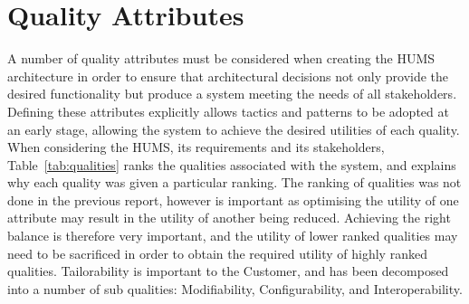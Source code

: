 \documentclass[10pt,a4paper]{article}
\begin{document}
\section{Quality Attributes}
\label{sec:qualities}
A number of quality attributes must be considered when creating the HUMS architecture in order to ensure that architectural decisions not only provide the desired functionality but produce a system meeting the needs of all stakeholders.
Defining these attributes explicitly allows tactics and patterns to be adopted at an early stage, allowing the system to achieve the desired utilities of each quality. 
When considering the HUMS, its requirements and its stakeholders, Table~\ref{tab:qualities} ranks the qualities associated with the system, and explains why each quality was given a particular ranking. The ranking of qualities was not done in the previous report, however is important as optimising the utility of one attribute may result in the utility of another being reduced. Achieving the right balance is therefore very important, and the utility of lower ranked qualities may need to be sacrificed in order to obtain the required utility of highly ranked qualities. Tailorability is important to the Customer, and has been decomposed into a number of sub qualities: Modifiability, Configurability, and Interoperability.
\end{document}
